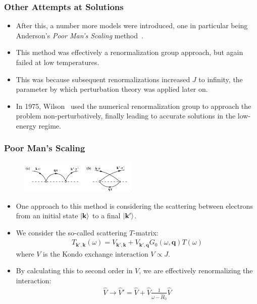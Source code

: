 \documentclass{beamer}
\newcommand{\vv}[1]{\mathbf{\bm{#1}}}
\begin{document}
\begin{frame}
  \frametitle{Other Attempts at Solutions}

  \begin{itemize}
  \item After this, a number more models were introduced, one in particular being Anderson's \textit{Poor Man's Scaling} method~\cite{Anderson_1970}.
  \item This method was effectively a renormalization group approach, but again failed at low temperatures.
  \item This was because subsequent renormalizations increased $J$ to infinity, the parameter by which perturbation theory was applied later on.
  \item In 1975, Wilson~\cite{Wilson_1975} used the numerical renormalization group to approach the problem non-perturbatively, finally leading to accurate solutions in the low-energy regime.
  \end{itemize}
\end{frame}



\begin{frame}
  \frametitle{Poor Man's Scaling}
  
  \begin{figure}[ht!]
    \centering
    \includegraphics[width=0.5\textwidth]{./gfx/poormans-feynman.png}
  \end{figure}

  \begin{itemize}
  \item One approach to this method is considering the scattering between electrons from an initial state $\ket{\vv{k}}$ to a final $\ket{\vv{k}'}$.
  \item We consider the so-called scattering $T$-matrix:
    \begin{gather*}
      T_{\vv{k}',\vv{k}}(\omega) = V_{\vv{k}',\vv{k}} + V_{\vv{k}',\vv{q}} G_0(\omega,\vv{q})T(\omega)
    \end{gather*}
    where $V$ is the Kondo exchange interaction $V \propto J$.
  \item By calculating this to second order in $V$, we are effectively renormalizing the interaction:
    \begin{gather*}
      \hat{V} \rightarrow \hat{V}' = \hat{V} + \hat{V} \frac{1}{\omega - \hat{H}_0} \hat{V}
    \end{gather*}
  \end{itemize}
\end{frame}
\end{document}
